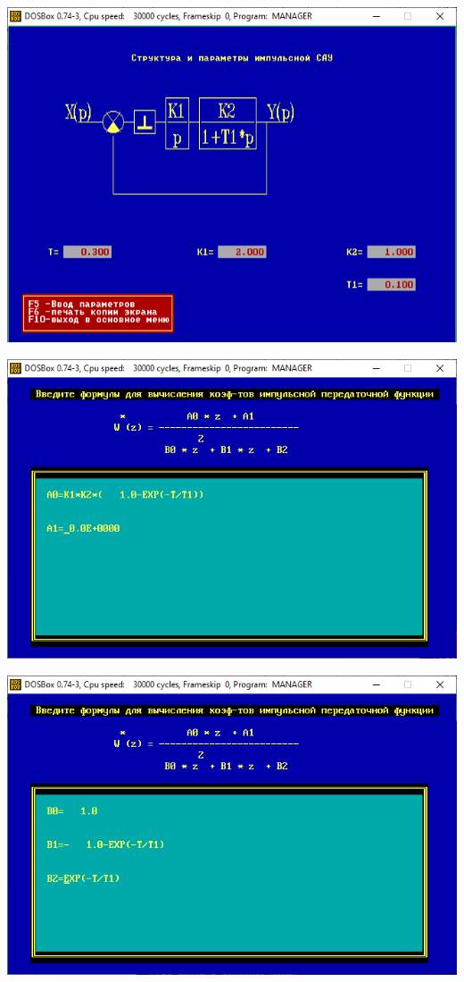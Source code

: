 	\begin{center}
		\noindent \begin{minipage}{.45\textwidth}
			\includegraphics[width=\textwidth]{png/scheme.png}
		\end{minipage} \begin{minipage}{.45\textwidth}
		\includegraphics[width=\textwidth]{png/pars1.png}
		\end{minipage}
		\begin{minipage}{.45\textwidth}
			\includegraphics[width=\textwidth]{png/pars2.png}

\end{minipage}
\end{center}
